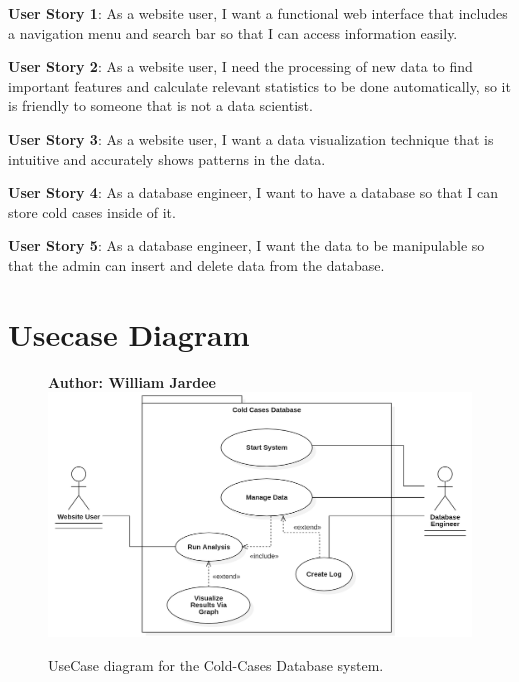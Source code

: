 \documentclass[11pt]{article}
\begin{document}
\noindent\textbf{\hypertarget{us1}{User Story 1}}:  As a website user, I want a functional web interface that includes a navigation menu and search bar so that I can access information easily.\vspace{0.5em}

\noindent\textbf{\hypertarget{us2}{User Story 2}}: As a website user, I need the processing of new data to find important features and calculate relevant statistics to be done automatically, so it is friendly to someone that is not a data scientist.\vspace{0.5em}

\noindent\textbf{\hypertarget{us3}{User Story 3}}: As a website user, I want a data visualization technique that is intuitive and accurately shows patterns in the data.\vspace{0.5em}

\noindent\textbf{\hypertarget{us4}{User Story 4}}: As a database engineer, I want to have a database so that I can store cold cases inside of it. \vspace{0.5em}

\noindent\textbf{\hypertarget{us5}{User Story 5}}: As a database engineer, I want the data to be manipulable so that the admin can insert and delete data from the database.\vspace{0.5em}

\clearpage

\section{Usecase Diagram}

\begin{figure}[!ht]
\centering
\textbf{Author: William Jardee}
	\includegraphics[width=.95\textwidth]{./UseCases/jardee_usecase}\\
	\caption{UseCase diagram for the Cold-Cases Database system.}
	\label{fig:usecase_diagram}
\end{figure}
\clearpage
\end{document}
